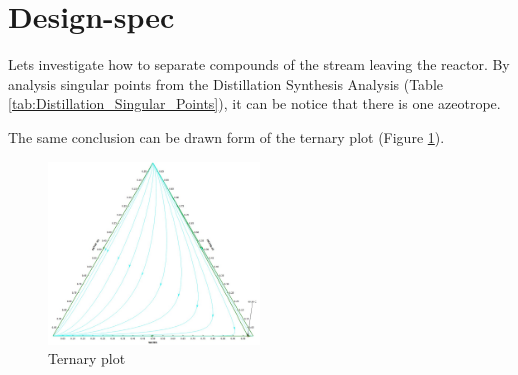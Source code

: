 \section{Design-spec}

Lets investigate how to separate compounds of the stream leaving the reactor. By analysis singular points from the Distillation Synthesis Analysis (Table \ref{tab:Distillation_Singular_Points}), it can be notice that there is one azeotrope.

\begin{table}[h!]
	\centering
	\caption{Singular points from the Distillation Synthesis Analysis}
	\label{tab:Distillation_Singular_Points}
\end{table}

The same conclusion can be drawn form of the ternary plot (Figure \ref{fig:Ester_Teranry}).

\begin{figure}[H]
	\centering
	\includegraphics[width=0.5\textwidth]{Figures/Proces_Analysis/Distillation.jpg}
	\caption{Ternary plot}
	\label{fig:Ester_Teranry}
\end{figure}

